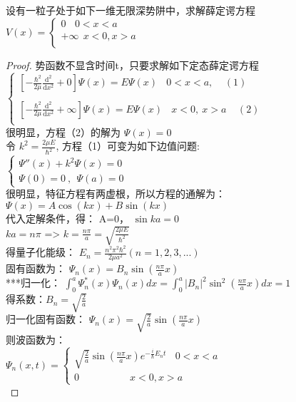 \begin{example} %
设有一粒子处于如下一维无限深势阱中，求解薛定谔方程\\
 { $ \displaystyle 
	V(x)=\left \{ 
	\begin{array}{cccc}
	     0	~~ ~~ 0<x<a \\  
		+\infty ~~x<0, x>a\\
	\end{array}
	\right.
	$} \\
\end{example}
\begin{proof}
势函数不显含时间t，只要求解如下定态薛定谔方程\\
{  $ \displaystyle 
	\left \{ 
	\begin{array}{cccc}
		\left [ -\frac{\hbar^2}{2\mu} \frac{\mathrm{d} ^2}{\mathrm{d} x^2} +0 \right ]\Psi(x)=E\Psi(x)  ~~ ~~ 0<x<a,~~~~~ (1)  \\ 
	     \\	
		\left [ -\frac{\hbar^2}{2\mu} \frac{\mathrm{d} ^2}{\mathrm{d} x^2} +\infty \right ]\Psi(x)=E\Psi(x)  ~~ ~~ x<0,~ x>a ~~~~~(2)  \\
	\end{array}
	\right.
	$} \\
很明显，方程（2）的解为  $\Psi(x) = 0$ \\ 
令 $ k^2= \frac{2\mu E}{\hbar ^2} $, 方程（1）可变为如下边值问题:  \\ 
{ $ \displaystyle 
\begin{cases}
		\Psi''(x) + k^2	\Psi(x)=0  \\
		\Psi(0)=0~,~~ \Psi(a)=0 ~~~~~
\end{cases}
	$} \\
很明显，特征方程有两虚根，所以方程的通解为：\\
$  \displaystyle	\Psi(x) = A\cos(kx) +B\sin(kx) $   \\ 
代入定解条件，得： A=0， $\sin ka =0$ \\ 
  $ka=n\pi $ => $k=\frac{n\pi}{a} = \sqrt{\frac{2\mu E}{\hbar ^2}}$    \\ 
得量子化能级：{ $E_n = \frac{n^2\pi^2\hbar^2}{2\mu a^2} (n=1,2,3,...)$}\\
固有函数为： $ \Psi_n(x) = B_n\sin(\frac{n\pi}{a}x) $ 	 \\ 
***归一化： $ \displaystyle \int_{0}^{a}  \Psi_n ^*(x)  \Psi_n(x)dx = \int_{0}^{a}  |B_n| ^2 \sin^2(\frac{n\pi}{a}x) dx =1$  \\ 
得系数：$B_n=\sqrt{\frac{2}{a}}$ \\ 
归一化固有函数： $ \Psi_n(x)= \sqrt{\frac{2}{a}} \sin(\frac{n\pi}{a}x) $ \\ 
则波函数为： \\
{  $ \displaystyle 
	\Psi_n(x,t)= \left \{ 
	\begin{array}{cccc}
		\sqrt{\frac{2}{a}} \sin(\frac{n\pi}{a}x) e^{-\frac{i}{\hbar} E_n t} ~~~~   0<x<a \\
		0 ~~~~~~~~~~~~~~~~~~~~~~~ x<0,x>a  
	\end{array}
	\right.
	$} \\
\end{proof}	

